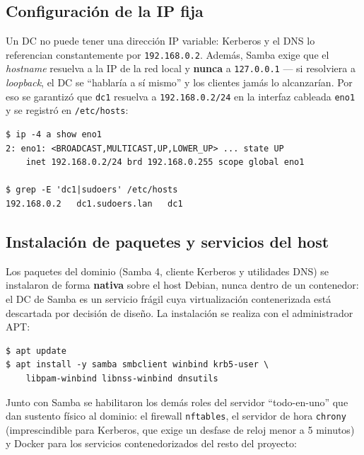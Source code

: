 \subsection{Configuración de la IP fija}

Un DC no puede tener una dirección IP variable: Kerberos y el DNS lo
referencian constantemente por \texttt{192.168.0.2}. Además, Samba exige que
el \textit{hostname} resuelva a la IP de la red local y \textbf{nunca} a
\texttt{127.0.0.1} — si resolviera a \textit{loopback}, el DC se ``hablaría
a sí mismo'' y los clientes jamás lo alcanzarían. Por eso se garantizó que
\texttt{dc1} resuelva a \texttt{192.168.0.2/24} en la interfaz cableada
\texttt{eno1} y se registró en \texttt{/etc/hosts}:

\begin{lstlisting}[style=terminal]
$ ip -4 a show eno1
2: eno1: <BROADCAST,MULTICAST,UP,LOWER_UP> ... state UP
    inet 192.168.0.2/24 brd 192.168.0.255 scope global eno1

$ grep -E 'dc1|sudoers' /etc/hosts
192.168.0.2   dc1.sudoers.lan   dc1
\end{lstlisting}


\subsection{Instalación de paquetes y servicios del host}

Los paquetes del dominio (Samba 4, cliente Kerberos y utilidades DNS) se
instalaron de forma \textbf{nativa} sobre el host Debian, nunca dentro de un
contenedor: el DC de Samba es un servicio frágil cuya virtualización
contenerizada está descartada por decisión de diseño. La instalación se
realiza con el administrador APT:

\begin{lstlisting}[style=terminal]
$ apt update
$ apt install -y samba smbclient winbind krb5-user \
    libpam-winbind libnss-winbind dnsutils
\end{lstlisting}

Junto con Samba se habilitaron los demás roles del servidor ``todo-en-uno''
que dan sustento físico al dominio: el firewall \texttt{nftables}, el
servidor de hora \texttt{chrony} (imprescindible para Kerberos, que exige un
desfase de reloj menor a 5 minutos) y Docker para los servicios
contenedorizados del resto del proyecto:

